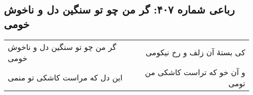 \begin{center}
\section*{رباعی شماره ۴۰۷: گر من چو تو سنگین دل و ناخوش خومی}
\label{sec:sh407}
\begin{longtable}{l p{0.5cm} r}
گر من چو تو سنگین دل و ناخوش خومی
&&
کی بستهٔ آن زلف و رخ نیکومی
\\
این دل که مراست کاشکی تو منمی
&&
و آن خو که تراست کاشکی من تومی
\\
\end{longtable}
\end{center}
